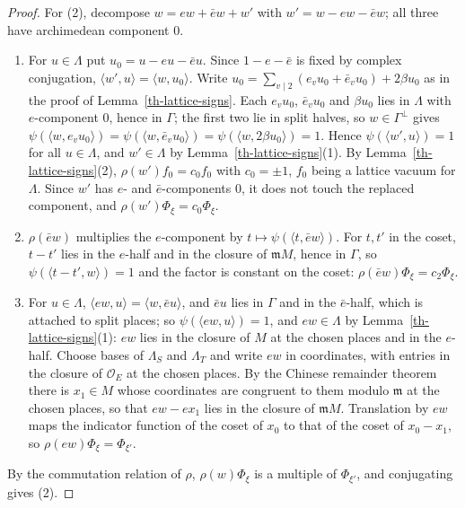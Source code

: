 \begin{proof}
For (2), decompose $w=ew+\bar ew+w'$ with $w'=w-ew-\bar ew$; all three have
archimedean component $0$.
\begin{enumerate}
\item[(i)] For $u\in\Lambda$ put $u_0=u-eu-\bar eu$. Since $1-e-\bar e$ is
  fixed by complex conjugation, $\langle w',u\rangle=\langle w,u_0\rangle$. Write
  $u_0=\sum_{v\mid2}(e_vu_0+\bar e_vu_0)+2\beta u_0$ as in the proof of
  Lemma~\ref{th-lattice-signs}. Each $e_vu_0$, $\bar e_vu_0$ and $\beta u_0$ lies
  in $\Lambda$ with $e$-component $0$, hence in $\Gamma$; the first two lie in
  split halves, so $w\in\Gamma^\perp$ gives $\psi(\langle w,e_vu_0\rangle)=
  \psi(\langle w,\bar e_vu_0\rangle)=\psi(\langle w,2\beta u_0\rangle)=1$. Hence
  $\psi(\langle w',u\rangle)=1$ for all $u\in\Lambda$, and $w'\in\Lambda$ by
  Lemma~\ref{th-lattice-signs}(1). By Lemma~\ref{th-lattice-signs}(2),
  $\rho(w')f_0=c_0f_0$ with $c_0=\pm1$, $f_0$ being a lattice vacuum for
  $\Lambda$. Since $w'$ has $e$- and $\bar e$-components $0$, it does not touch
  the replaced component, and $\rho(w')\Phi_\xi=c_0\Phi_\xi$.
\item[(ii)] $\rho(\bar ew)$ multiplies the $e$-component by
  $t\mapsto\psi(\langle t,\bar ew\rangle)$. For $t,t'$ in the coset, $t-t'$ lies
  in the $e$-half and in the closure of $\mathfrak mM$, hence in $\Gamma$, so
  $\psi(\langle t-t',w\rangle)=1$ and the factor is constant on the coset:
  $\rho(\bar ew)\Phi_\xi=c_2\Phi_\xi$.
\item[(iii)] For $u\in\Lambda$, $\langle ew,u\rangle=\langle w,\bar eu\rangle$,
  and $\bar eu$ lies in $\Gamma$ and in the $\bar e$-half, which is attached to
  split places; so $\psi(\langle ew,u\rangle)=1$, and $ew\in\Lambda$ by
  Lemma~\ref{th-lattice-signs}(1): $ew$ lies in the closure of $M$ at the
  chosen places and in the $e$-half. Choose bases of $\Lambda_S$ and $\Lambda_T$
  and write $ew$ in coordinates, with entries in the closure of $\mathcal O_E$ at
  the chosen places. By the Chinese remainder theorem there is $x_1\in M$ whose
  coordinates are congruent to them modulo $\mathfrak m$ at the chosen places, so
  that $ew-ex_1$ lies in the closure of $\mathfrak mM$. Translation by $ew$ maps
  the indicator function of the coset of $x_0$ to that of the coset of
  $x_0-x_1$, so $\rho(ew)\Phi_\xi=\Phi_{\xi'}$.
\end{enumerate}
By the commutation relation of $\rho$, $\rho(w)\Phi_\xi$ is a multiple of
$\Phi_{\xi'}$, and conjugating gives (2).
\end{proof}

